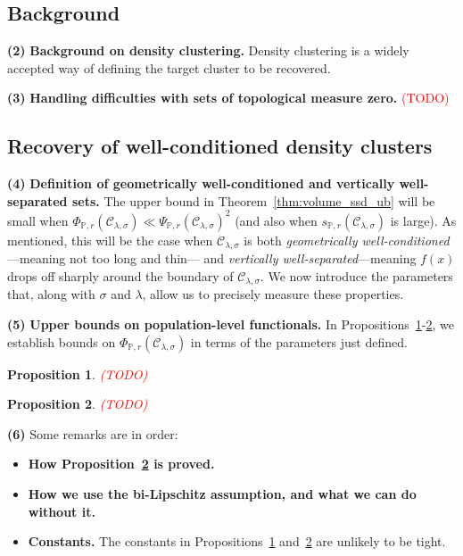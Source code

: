 \documentclass{article}
\newcommand{\1}{\mathbf{1}}
\newcommand{\mc}[1]{\mathcal{#1}}
\newcommand{\Pbb}{\mathbb{P}}
\theoremstyle{alden}
\theoremstyle{aldenthm}
\newtheorem{proposition}{Proposition}
\theoremstyle{definition}
\theoremstyle{remark}
\begin{document}
\subsection{Background}

\textbf{(2)} \textbf{Background on density clustering.} Density clustering is a widely accepted way of defining the target cluster to be recovered.

\textbf{(3)} \textbf{Handling difficulties with sets of topological measure zero.} \textcolor{red}{(TODO)}

\subsection{Recovery of well-conditioned density clusters}
\label{subsec:recovery_well-conditioned_density_clusters}

\textbf{(4)} \textbf{Definition of geometrically well-conditioned and vertically well-separated sets.} The upper bound in Theorem~\ref{thm:volume_ssd_ub} will be small when  $\Phi_{\Pbb,r}(\mc{C}_{\lambda,\sigma}) \ll \Psi_{\Pbb,r}(\mc{C}_{\lambda,\sigma})^2$ (and also when $s_{\Pbb,r}(\mc{C}_{\lambda,\sigma})$ is large). As mentioned, this will be the case when $\mc{C}_{\lambda,\sigma}$ is both \emph{geometrically well-conditioned}---meaning not too long and thin--- and \emph{vertically well-separated}---meaning $f(x)$ drops off sharply around the boundary of $\mc{C}_{\lambda,\sigma}$. We now introduce the parameters that, along with $\sigma$ and $\lambda$, allow us to precisely measure these properties.

\textbf{(5)} \textbf{Upper bounds on population-level functionals.} In Propositions~\ref{prop:density_cluster_normalized_cut}-\ref{prop:density_cluster_conductance}, we establish bounds on $\Phi_{\Pbb,r}(\mc{C}_{\lambda,\sigma})$ in terms of the parameters just defined.

\begin{proposition}
	\label{prop:density_cluster_normalized_cut}
	\textcolor{red}{(TODO)}
\end{proposition}

\begin{proposition}
	\label{prop:density_cluster_conductance}
	\textcolor{red}{(TODO)}
\end{proposition}

\textbf{(6)} Some remarks are in order:
\begin{itemize}
	\item \textbf{How Proposition~\ref{prop:density_cluster_conductance} is proved.}
	\item \textbf{How we use the bi-Lipschitz assumption, and what we can do without it.}
	\item \textbf{Constants.} The constants in Propositions~\ref{prop:density_cluster_normalized_cut} and~\ref{prop:density_cluster_conductance} are unlikely to be tight.
\end{itemize}
\end{document}
